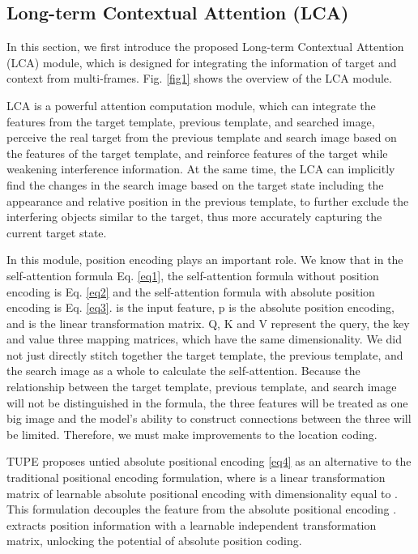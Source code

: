 \documentclass[letterpaper]{article} \usepackage{aaai23}  \usepackage{times}  \usepackage{helvet}  \usepackage{courier}  \usepackage[hyphens]{url}  \usepackage{graphicx} \urlstyle{rm} \def\UrlFont{\rm}  \usepackage{natbib}  \usepackage{caption} \frenchspacing  \setlength{\pdfpagewidth}{8.5in}  \setlength{\pdfpageheight}{11in}  \usepackage{algorithm}
\begin{document}
\subsection{Long-term Contextual Attention (LCA)}
In this section, we first introduce the proposed Long-term Contextual Attention (LCA) module, which is designed for integrating the information of target and context from multi-frames. Fig. \ref{fig1} shows the overview of the LCA module.

LCA is a powerful attention computation module, which can integrate the features from the target template, previous template, and searched image, perceive the real target from the previous template and search image based on the features of the target template, and reinforce features of the target while weakening interference information. At the same time, the LCA can implicitly find the changes in the search image based on the target state including the appearance and relative position in the previous template, to further exclude the interfering objects similar to the target, thus more accurately capturing the current target state.

In this module, position encoding plays an important role. We know that in the self-attention formula Eq. \ref{eq1}, the self-attention formula without position encoding is Eq. \ref{eq2} and the self-attention formula with absolute position encoding is Eq. \ref{eq3}.  is the input feature, p is the absolute position encoding, and  is the linear transformation matrix. Q, K and V represent the query, the key and value three mapping matrices, which have the same dimensionality. We did not just directly stitch together the target template, the previous template, and the search image as a whole to calculate the self-attention. Because the relationship between the target template, previous template, and search image will not be distinguished in the formula, the three features will be treated as one big image and the model's ability to construct connections between the three will be limited. Therefore, we must make improvements to the location coding.
 


TUPE \cite{tupe} proposes untied absolute positional encoding \ref{eq4} as an alternative to the traditional positional encoding formulation, where  is a linear transformation matrix of learnable absolute positional encoding with dimensionality equal to . This formulation decouples the feature  from the absolute positional encoding .  extracts position information with a learnable independent transformation matrix, unlocking the potential of absolute position coding.
\end{document}
